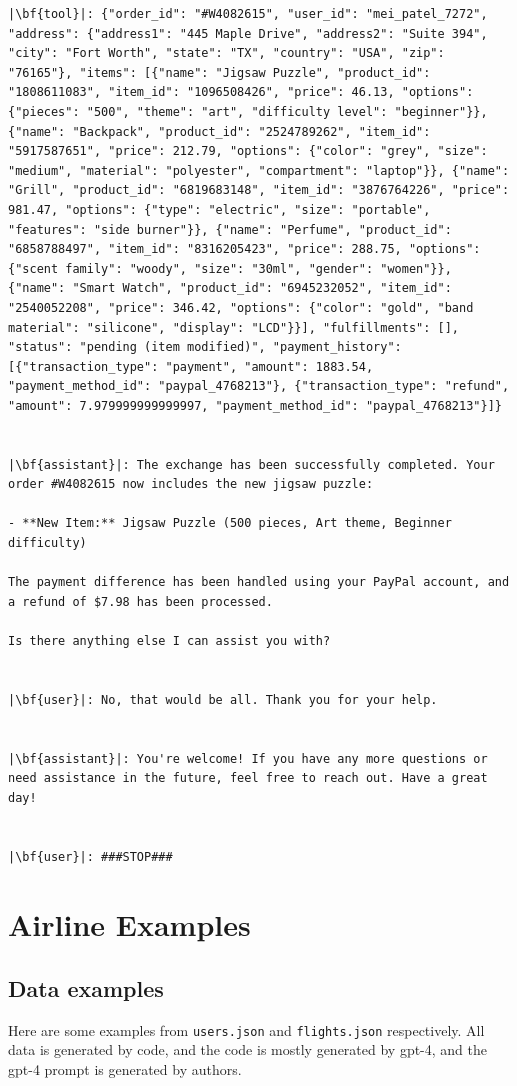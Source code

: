 \begin{verbatim}
|\bf{tool}|: {"order_id": "#W4082615", "user_id": "mei_patel_7272", "address": {"address1": "445 Maple Drive", "address2": "Suite 394", "city": "Fort Worth", "state": "TX", "country": "USA", "zip": "76165"}, "items": [{"name": "Jigsaw Puzzle", "product_id": "1808611083", "item_id": "1096508426", "price": 46.13, "options": {"pieces": "500", "theme": "art", "difficulty level": "beginner"}}, {"name": "Backpack", "product_id": "2524789262", "item_id": "5917587651", "price": 212.79, "options": {"color": "grey", "size": "medium", "material": "polyester", "compartment": "laptop"}}, {"name": "Grill", "product_id": "6819683148", "item_id": "3876764226", "price": 981.47, "options": {"type": "electric", "size": "portable", "features": "side burner"}}, {"name": "Perfume", "product_id": "6858788497", "item_id": "8316205423", "price": 288.75, "options": {"scent family": "woody", "size": "30ml", "gender": "women"}}, {"name": "Smart Watch", "product_id": "6945232052", "item_id": "2540052208", "price": 346.42, "options": {"color": "gold", "band material": "silicone", "display": "LCD"}}], "fulfillments": [], "status": "pending (item modified)", "payment_history": [{"transaction_type": "payment", "amount": 1883.54, "payment_method_id": "paypal_4768213"}, {"transaction_type": "refund", "amount": 7.979999999999997, "payment_method_id": "paypal_4768213"}]}


|\bf{assistant}|: The exchange has been successfully completed. Your order #W4082615 now includes the new jigsaw puzzle:

- **New Item:** Jigsaw Puzzle (500 pieces, Art theme, Beginner difficulty)

The payment difference has been handled using your PayPal account, and a refund of $7.98 has been processed.

Is there anything else I can assist you with?


|\bf{user}|: No, that would be all. Thank you for your help.


|\bf{assistant}|: You're welcome! If you have any more questions or need assistance in the future, feel free to reach out. Have a great day!


|\bf{user}|: ###STOP###
\end{verbatim}

\newpage 

\section{Airline Examples} 

\subsection{Data examples} \label{sec:airline_data}
Here are some examples from \texttt{users.json} and \texttt{flights.json} respectively. All data is generated by code, and the code is mostly generated by gpt-4, and the gpt-4 prompt is generated by authors.

